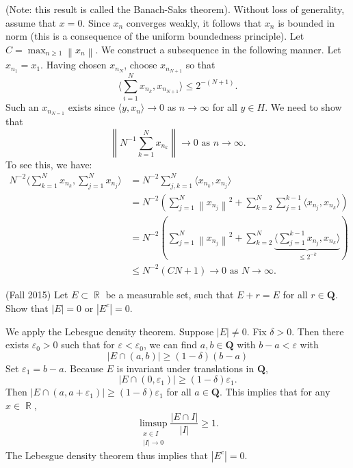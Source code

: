 \documentclass{exam}
\DeclareMathOperator{\RR}{\mathbb{R}}
\theoremstyle{problemstyle}
\newcommand{\norm}[1]{\left\lVert#1\right\rVert} %
\newcommand{\1}[1]{\textbf{1}_{\left[#1\right]}} %
\begin{document}
\begin{questions}
\begin{solution}
  (Note: this result is called the Banach-Saks theorem). Without loss of generality, assume that $x=0$. Since $x_{n}$ converges weakly, it follows that $x_{n}$ is bounded in norm (this is a consequence of the uniform boundedness principle). Let $C = \max_{n\geq 1}\norm{x_{n}}$. We construct a subsequence in the following manner. Let $x_{n_{1}}=x_{1}$. Having chosen $x_{n_{N}}$, choose $x_{n_{N+1}}$ so that
  \begin{equation*}
    \Big\langle \sum_{i=1}^{N}x_{n_{k}},x_{n_{N+1}}\Big\rangle \leq 2^{-(N+1)}.
  \end{equation*}
  Such an $x_{n_{N=1}}$ exists since $\langle y,x_{n}\rangle \to 0$ as $n\to \infty$ for all $y\in H$. We need to show that
  \begin{equation*}
    \norm{N^{-1}\sum_{k=1}^{N}x_{n_{k}}}\to 0 \text{ as }n\to\infty.
  \end{equation*}
  To see this, we have:
  \begin{align*}
    N^{-2}\Big\langle \sum_{k=1}^{N}x_{n_{k}}, \sum_{j=1}^{N}x_{n_{j}} \Big\rangle
    &= N^{-2}\sum_{j,k=1}^{N}\Big\langle x_{n_{k}}, x_{n_{j}}\Big\rangle\\
    &= N^{-2}\left( \sum_{j=1}^{N}\norm{x_{n_{j}}}^{2}+ \sum_{k=2}^{N}\sum_{j=1}^{k-1}\langle x_{n_{j}},x_{n_{k}}\rangle \right)\\
    &=N^{-2} \left(  \sum_{j=1}^{N}\norm{x_{n_{j}}}^{2}+ \sum_{k=2}^{N}\underbrace{\Big\langle \sum_{j=1}^{k-1} x_{n_{j}},x_{n_{k}}\Big\rangle}_{\leq 2^{-k}} \right)\\
    &\leq N^{-2} \left( C N + 1  \right) \to 0 \text{ as } N\to\infty.
  \end{align*}
\end{solution}

  
  
\question (Fall 2015) Let $E \subset \RR$ be a measurable set, such that $E + r = E$ for all $r \in \mathbf{Q}$. Show that $|E| = 0$ or $|E^c| = 0$.
\begin{solution}
    We apply the Lebesgue density theorem. Suppose $|E| \neq 0$. Fix $\delta > 0$. Then there exists $\varepsilon_0 > 0$ such that for $\varepsilon < \varepsilon_0$, we can find $a,b \in \mathbf{Q}$ with $b - a < \varepsilon$ with
    \[ |E \cap (a,b)| \geq (1 - \delta) (b - a) \]
    Set $\varepsilon_1 = b - a$. Because $E$ is invariant under translations in $\mathbf{Q}$,
    \[ |E \cap (0,\varepsilon_1)| \geq (1 - \delta) \varepsilon_1. \]
    Then $|E \cap (a,a + \varepsilon_1)| \geq (1 - \delta) \varepsilon_1$ for all $a \in \mathbf{Q}$. This implies that for any $x \in \RR$,
    \[ \limsup_{\substack{x \in I\\|I| \to 0}} \frac{|E \cap I|}{|I|} \geq 1. \]
    The Lebesgue density theorem thus implies that $|E^c| = 0$.
\end{solution}


\end{questions}
\end{document}

